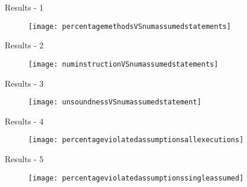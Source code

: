 \begin{frame}{Results - 1}

\begin{figure}
  \texttt{[image: percentagemethodsVSnumassumedstatements]}
\end{figure}

\end{frame}



\begin{frame}{Results - 2}

\begin{figure}
  \texttt{[image: numinstructionVSnumassumedstatements]}
\end{figure}

\end{frame}



\begin{frame}{Results - 3}

\begin{figure}
  \texttt{[image: unsoundnessVSnumassumedstatement]}
\end{figure}

\end{frame}



\begin{frame}{Results - 4}

\begin{figure}
  \texttt{[image: percentageviolatedassumptionsallexecutions]}
\end{figure}

\end{frame}



\begin{frame}{Results - 5}

\begin{figure}
  \texttt{[image: percentageviolatedassumptionssingleassumed]}
\end{figure}

\end{frame}